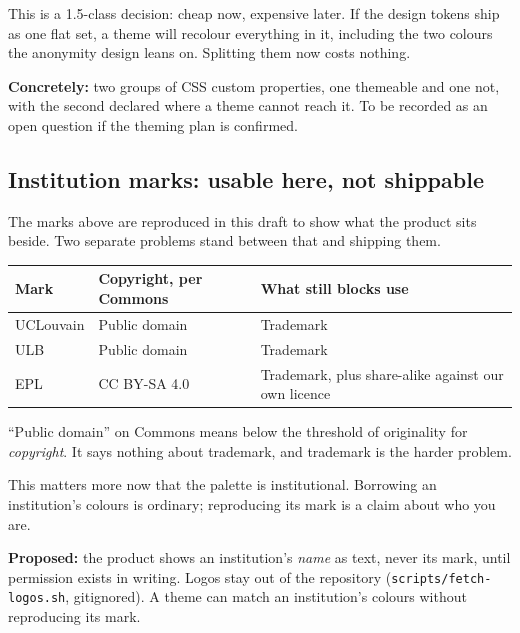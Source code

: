 \documentclass[11pt,a4paper]{article}
\begin{document}
\begin{why}
This is a 1.5-class decision: cheap now, expensive later. If the design tokens
ship as one flat set, a theme will recolour everything in it, including the two
colours the anonymity design leans on. Splitting them now costs nothing.

\textbf{Concretely:} two groups of CSS custom properties, one themeable and one
not, with the second declared where a theme cannot reach it. To be recorded as
an open question if the theming plan is confirmed.
\end{why}

\subsection{Institution marks: usable here, not shippable}

The marks above are reproduced in this draft to show what the product sits
beside. Two separate problems stand between that and shipping them.

\begin{center}
\sffamily\small
\begin{tabular}{@{}p{4.2cm}p{4.0cm}p{5.6cm}@{}}
\toprule
\textbf{Mark} & \textbf{Copyright, per Commons} & \textbf{What still blocks use} \\
\midrule
UCLouvain & Public domain & Trademark \\
ULB & Public domain & Trademark \\
EPL & CC BY-SA 4.0 & Trademark, plus share-alike against our own licence \\
\bottomrule
\end{tabular}
\end{center}

``Public domain'' on Commons means below the threshold of originality for
\emph{copyright}. It says nothing about trademark, and trademark is the harder
problem.

This matters more now that the palette is institutional. Borrowing an
institution's colours is ordinary; reproducing its mark is a claim about who
you are.

\begin{openq}
\textbf{Proposed:} the product shows an institution's \emph{name} as text, never
its mark, until permission exists in writing. Logos stay out of the repository
(\texttt{scripts/fetch-logos.sh}, gitignored). A theme can match an
institution's colours without reproducing its mark.
\end{openq}
\end{document}
